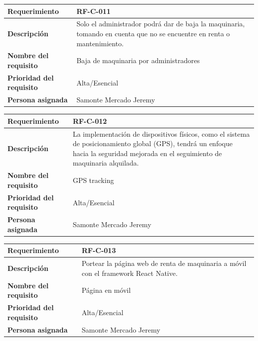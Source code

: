 \documentclass{article}
\begin{document}
\begin{center}
\begin{tabular}{|p{3cm}|p{9cm}|}
\hline
\textbf{Requerimiento} & RF-C-011 \\
\hline
\textbf{Descripción} & Solo el administrador podrá dar de baja la maquinaria, tomando en cuenta que no se encuentre en renta o mantenimiento. \\
\hline
\textbf{Nombre del requisito} & Baja de maquinaria por administradores \\
\hline
\textbf{Prioridad del requisito} & Alta/Esencial \\
\hline
\textbf{Persona asignada} & Samonte Mercado Jeremy \\
\hline
\end{tabular}
\end{center}

\begin{center}
\begin{tabular}{|p{3cm}|p{9cm}|}
\hline
\textbf{Requerimiento} & RF-C-012 \\
\hline
\textbf{Descripción} & La implementación de dispositivos físicos, como el sistema de posicionamiento global (GPS), tendrá un enfoque hacia la seguridad mejorada en el seguimiento de maquinaria alquilada. \\
\hline
\textbf{Nombre del requisito} & GPS tracking \\
\hline
\textbf{Prioridad del requisito} & Alta/Esencial \\
\hline
\textbf{Persona asignada} & Samonte Mercado Jeremy \\
\hline
\end{tabular}
\end{center}

\begin{center}
\begin{tabular}{|p{3cm}|p{9cm}|}
\hline
\textbf{Requerimiento} & RF-C-013 \\
\hline
\textbf{Descripción} & Portear la página web de renta de maquinaria a móvil con el framework React Native. \\
\hline
\textbf{Nombre del requisito} & Página en móvil \\
\hline
\textbf{Prioridad del requisito} & Alta/Esencial \\
\hline
\textbf{Persona asignada} & Samonte Mercado Jeremy \\
\hline
\end{tabular}
\end{center}
\end{document}
